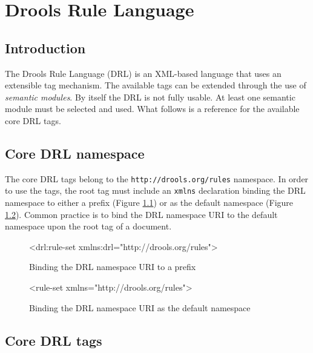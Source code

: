 \chapter{Drools Rule Language}
\label{drl}

\section{Introduction}

The Drools Rule Language (DRL) is an XML-based
language that uses an extensible tag mechanism.  The available tags
can be extended through the use of \emph{semantic modules}.
By itself the DRL is not fully usable.  At least one semantic module
must be selected and used.  What follows is a reference for the
available core DRL tags.

\section{Core DRL namespace}

The core DRL tags belong to the \verb|http://drools.org/rules|
namespace.  In order to use the tags, the root tag must include
an \verb|xmlns| declaration binding the DRL namespace to either
a prefix (Figure \ref{drl.namespace.prefix}) or as the default namespace
(Figure \ref{drl.namespace.default}).  Common practice is to bind the
DRL namespace URI to the default namespace upon the root
 tag of a document.

\begin{figure}[hb]
\begin{tagExample}
<drl:rule-set {\color{black}xmlns:drl="http://drools.org/rules"}>
\end{tagExample}
\caption{Binding the DRL namespace URI to a prefix}
\label{drl.namespace.prefix}
\end{figure}

\begin{figure}[hb]
\begin{tagExample}
<rule-set {\color{black}xmlns="http://drools.org/rules"}>
\end{tagExample}
\caption{Binding the DRL namespace URI as the default namespace}
\label{drl.namespace.default}
\end{figure}

\section{Core DRL tags}


